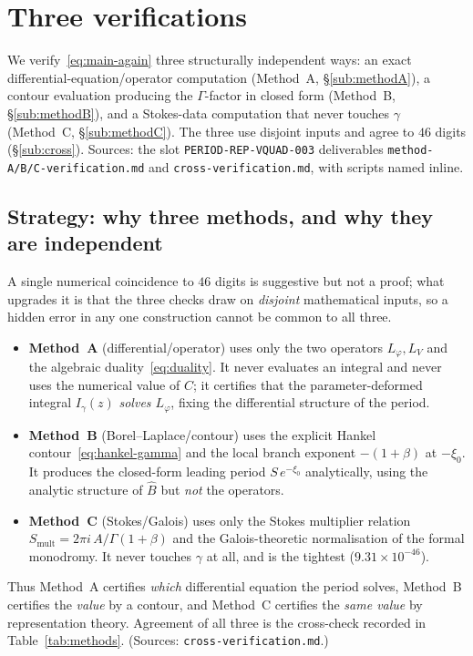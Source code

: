 \documentclass[11pt,reqno]{amsart}
\renewcommand{\_}{\vquadorigunderscore\allowbreak}
\theoremstyle{plain}
\theoremstyle{definition}
\newcommand{\Bhat}{\widehat{B}}
\newcommand{\Lphi}{L_{\varphi}}
\newcommand{\LV}{L_{V}}
\newcommand{\xizero}{\xi_0}
\providecommand{\C}{}\renewcommand{\C}{C}
\begin{document}
\section{Three verifications}\label{sec:verif}

We verify~\eqref{eq:main-again} three structurally independent ways: an exact
differential-equation/operator computation (Method~A, \S\ref{sub:methodA}), a contour evaluation
producing the $\Gamma$-factor in closed form (Method~B, \S\ref{sub:methodB}), and a Stokes-data
computation that never touches $\gamma$ (Method~C, \S\ref{sub:methodC}). The three use disjoint
inputs and agree to $46$ digits (\S\ref{sub:cross}). Sources: the slot
\texttt{PERIOD-REP-VQUAD-003} deliverables \texttt{method-A/B/C-verification.md} and
\texttt{cross-verification.md}, with scripts named inline.

\subsection{Strategy: why three methods, and why they are independent}\label{sub:strategy}
A single numerical coincidence to $46$ digits is suggestive but not a proof; what upgrades it is
that the three checks draw on \emph{disjoint} mathematical inputs, so a hidden error in any one
construction cannot be common to all three.
\begin{itemize}[leftmargin=1.6em]
\item \textbf{Method~A} (differential/operator) uses only the two operators $\Lphi,\LV$ and the
algebraic duality~\eqref{eq:duality}. It never evaluates an integral and never uses the numerical
value of $\C$; it certifies that the parameter-deformed integral $I_\gamma(z)$ \emph{solves
$\Lphi$}, fixing the differential structure of the period.
\item \textbf{Method~B} (Borel--Laplace/contour) uses the explicit Hankel
contour~\eqref{eq:hankel-gamma} and the local branch exponent $-(1+\beta)$ at $-\xizero$. It
produces the closed-form leading period $S\,e^{-\xizero}$ analytically, using the analytic
structure of $\Bhat$ but \emph{not} the operators.
\item \textbf{Method~C} (Stokes/Galois) uses only the Stokes multiplier relation
$S_{\mathrm{mult}}=2\pi i\,A/\Gamma(1+\beta)$ and the Galois-theoretic normalisation of the
formal monodromy. It never touches $\gamma$ at all, and is the tightest ($9.31\times10^{-46}$).
\end{itemize}
Thus Method~A certifies \emph{which} differential equation the period solves, Method~B certifies
the \emph{value} by a contour, and Method~C certifies the \emph{same value} by representation
theory. Agreement of all three is the cross-check recorded in Table~\ref{tab:methods}. (Sources:
\texttt{cross-verification.md}.)
\end{document}
